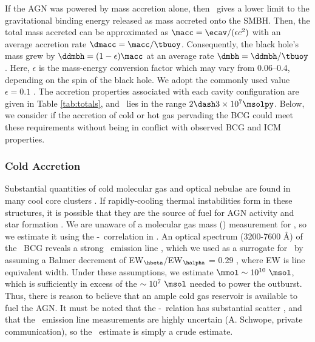 \documentclass[apjpt4]{aastex}
\begin{document}
If the AGN was powered by mass accretion alone, then \ecav\ gives a
lower limit to the gravitational binding energy released as mass
accreted onto the SMBH. Then, the total mass accreted can be
approximated as $\macc = \ecav/(\epsilon c^2)$ with an average
accretion rate $\dmacc = \macc/\tbuoy$. Consequently, the black hole's
mass grew by $\ddmbh = (1-\epsilon)\macc$ at an average rate $\dmbh =
\ddmbh/\tbuoy$. Here, $\epsilon$ is the mass-energy conversion factor
which may vary from 0.06--0.4, depending on the spin of the black
hole. We adopt the commonly used value $\epsilon = 0.1$
\citep{2002apa..book.....F}. The accretion properties associated with
each cavity configuration are given in Table \ref{tab:totals}, and
\macc\ lies in the range $2 \dash 3 \times 10^7 \msolpy$. Below, we
consider if the accretion of cold or hot gas pervading the BCG could
meet these requirements without being in conflict with observed BCG
and ICM properties.

\subsubsection{Cold Accretion}
\label{sec:cold}

Substantial quantities of cold molecular gas and optical nebulae are
found in many cool core clusters \citep{crawford99, edge01}. If
rapidly-cooling thermal instabilities form in these structures, it is
possible that they are the source of fuel for AGN activity and star
formation \citep[\eg][]{pizzolato05, 2006NewA...12...38S,
  2010MNRAS.408..961P}. We are unaware of a molecular gas mass (\mmol)
measurement for \rbs, so we estimate it using the
\mmol-\halpha\ correlation in \citet{edge01}. An optical spectrum
(3200-7600 \AA) of the \rbs\ BCG reveals a strong \hbeta\ emission
line \citep{rbs1, rbs2}, which we used as a surrogate for \halpha\ by
assuming a Balmer decrement of EW$_{\hbeta}$/EW$_{\halpha}$ = 0.29
\citep{2006ApJ...642..775M}, where EW is line equivalent width. Under
these assumptions, we estimate $\mmol \sim 10^{10} ~\msol$, which is
sufficiently in excess of the $\sim 10^7 ~\msol$ needed to power the
outburst. Thus, there is reason to believe that an ample cold gas
reservoir is available to fuel the AGN. It must be noted that the
\mmol-\halpha\ relation has substantial scatter \citep{salome03}, and
that the \rbs\ emission line measurements are highly uncertain
(A. Schwope, private communication), so the \mmol\ estimate is simply
a crude estimate.
\end{document}
